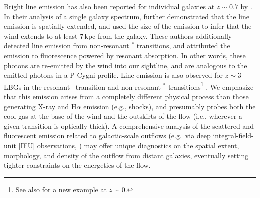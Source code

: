 \documentclass[12pt,preprint]{aastex}
\begin{document}
Bright  line emission has also been
reported for individual galaxies at $z \sim 0.7$ by \cite[][see also
Rubin et al\ 2011, in prep.]{rubin+10c}.
In their analysis of a single galaxy spectrum, \cite{rubin+10c}
further demonstrated that the  line emission is spatially
extended, and used the size of the emission to infer that the wind 
extends to at least 7\,kpc from the galaxy.
These authors additionally detected line
emission from non-resonant $^*$ transitions, and attributed
the emission to fluorescence powered by  resonant
absorption.  In other words, these photons are re-emitted by the wind
into our sightline, and are analogous to the emitted photons in a P-Cygni profile.
Line-emission is
also observed for $z \sim 3$ LBGs in the resonant \lya\ transition
and non-resonant $^*$ transitions\footnote{See also
  \cite{france10} for a new example at $z \sim 0$.} \citep{prs+02,shapley03}.
We emphasize that this emission arises from a completely different
physical process than those generating X-ray and H$\alpha$ emission
(e.g., shocks), and presumably probes both the cool gas at the base of
the wind and the outskirts of the flow (i.e., wherever a given
transition is optically thick).
A comprehensive analysis of the %
scattered and fluorescent emission
related to galactic-scale outflows
(e.g.\ via deep integral-field-unit [IFU] observations,
\citealt{ssb+05,wsg08}) 
may offer unique
diagnostics on the spatial extent, morphology, and density of the outflow 
from distant galaxies,
eventually
setting tighter constraints on the energetics of the flow.   

\end{document}
